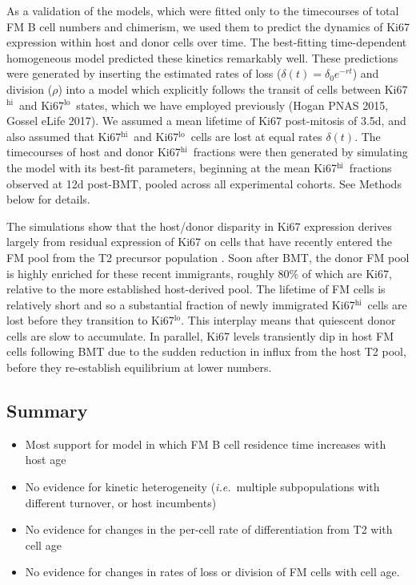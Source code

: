 \documentclass[11pt]{article}
\newcommand{\red}[1]{{\color{red}{#1}}}
\newcommand{\ie}{\textit{i.e.}}
\newcommand{\khi}{Ki67$^\text{hi}$}
\newcommand{\klo}{Ki67$^\text{lo}$}
\begin{document}
As a validation of the models,  which were fitted only to the timecourses of total FM B cell numbers and chimerism, we used them to predict the dynamics of Ki67 expression within host and donor cells over time. The best-fitting time-dependent homogeneous model  predicted these kinetics remarkably well. These predictions were generated by inserting the estimated rates of loss ($\delta(t) = \delta_{0} e^{-rt}$) and division ($\rho$) into a model which explicitly follows the transit of cells between \khi\ and \klo\ states, which we have employed previously (Hogan PNAS 2015, Gossel eLife 2017). We assumed a mean lifetime of Ki67 post-mitosis of 3.5d, and also assumed that \khi\ and \klo\ cells are lost at equal rates $\delta(t)$. The timecourses of host and donor \khi\ fractions were then generated by simulating the model with its best-fit parameters, beginning at the mean \khi\ fractions observed at 12d post-BMT, pooled across all experimental cohorts. See Methods below for details.

The simulations show that the host/donor disparity in Ki67 expression derives largely from residual expression of Ki67 on cells that have recently entered the FM pool from the T2 precursor population \red{T2s are not dividing, you say... so surely this is further evidence that T1s are the source for FMs?}.  Soon after BMT, the donor FM pool is highly enriched for these recent immigrants, roughly 80\% of which are Ki67,  relative to the more established host-derived pool. The lifetime of FM cells is relatively short and so a substantial fraction of newly immigrated \khi\ cells  are lost before they transition to \klo. This interplay means that quiescent donor cells are slow to accumulate. In parallel, Ki67 levels transiently dip in host FM cells following BMT due to the sudden reduction in influx from the host T2 pool, before they re-establish equilibrium at lower numbers. 

\subsection*{Summary}
\begin{itemize}
\item Most support for model in which FM B cell residence time increases with host age
\item No evidence for kinetic heterogeneity (\ie\ multiple subpopulations with different turnover, or host incumbents) 
\item No evidence for changes in the per-cell rate of differentiation from T2 with cell age
\item No evidence for changes in rates of loss or division of FM cells with cell age.
\end{itemize}
\end{document}
